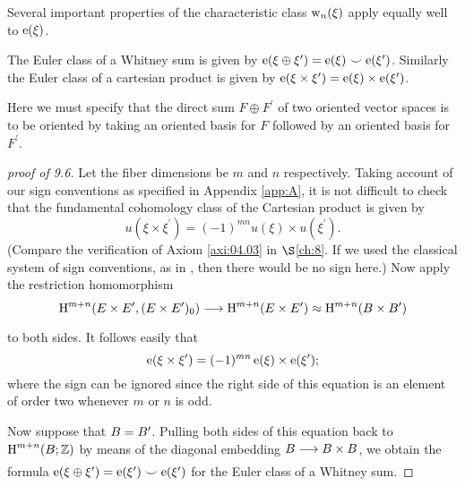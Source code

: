 \documentclass[../main]{subfiles}
\begin{document}
Several important properties of the characteristic class $\operatorname{w}_{n}(\xi)$ apply equally well to $\operatorname{e}(\xi)$. 

\begin{property}\label{pro:09.06}
 The Euler class of a Whitney sum is given by \newline
 $\operatorname{e}(\xi \oplus \xi^{\prime})=\operatorname{e}(\xi) \smile \operatorname{e}(\xi^{\prime})$. Similarly the Euler class of a cartesian product is given by $\operatorname{e}(\xi \times \xi^{\prime})=\operatorname{e}(\xi) \times \operatorname{e}(\xi^{\prime})$.
\end{property} 

Here we must specify that the direct sum $F \oplus F^{\prime}$ of two oriented vector spaces is to be oriented by taking an oriented basis for $F$ followed by an oriented basis for $F^{\prime}$.

\begin{proof}[proof of 9.6]
Let the fiber dimensions be $m$ and $n$ respectively. Taking account of our sign conventions as specified in Appendix \ref{app:A}, it is not difficult to check that the fundamental cohomology class of the Cartesian product is given by
\[
u(\xi \times \xi^{\prime})=(-1)^{mn} u(\xi) \times u(\xi^{\prime}) .
\]
(Compare the verification of Axiom \ref{axi:04.03} in $\S$\ref{ch:8}. If we used the classical system of sign conventions, as in \cite{spanier1981}, then there would be no sign here.) Now apply the restriction homomorphism
\[
\homology^{m+n}(\total \times \total^{\prime},(\total \times \total^{\prime})_{0}) \varrightarrow{} \homology^{m+n}(\total \times \total^{\prime}) \approx \homology^{m+n}(\base \times \base^{\prime})
\]
to both sides. It follows easily that
\[
\operatorname{e}(\xi \times \xi^{\prime})=(-1)^{mn} \operatorname{e}(\xi) \times \operatorname{e}(\xi^{\prime}) ;
\]
where the sign can be ignored since the right side of this equation is an element of order two whenever $m$ or $n$ is odd.

Now suppose that $B=B^{\prime}$. Pulling both sides of this equation back to $\operatorname{H}^{m+n}(B ; \mathbb{Z})$ by means of the diagonal embedding $\base \varrightarrow{} \base \times \base$, we obtain the formula $\operatorname{e}(\xi \oplus \xi^{\prime})=\operatorname{e}(\xi^{\prime}) \smile \operatorname{e}(\xi^{\prime})$ for the Euler class of a Whitney sum.
\end{proof} 
\end{document}
